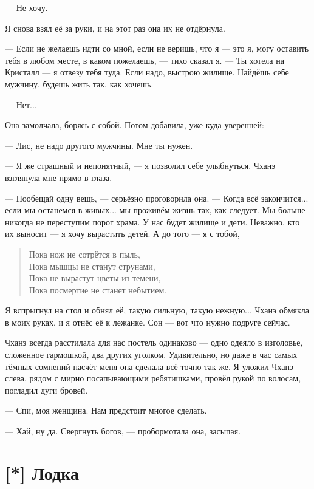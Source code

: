 --- Не хочу.

Я снова взял её за руки, и на этот раз она их не отдёрнула.

--- Если не желаешь идти со мной, если не веришь, что я --- это я, могу оставить тебя в любом месте, в каком пожелаешь, --- тихо сказал я.
--- Ты хотела на Кристалл --- я отвезу тебя туда.
Если надо, выстрою жилище.
Найдёшь себе мужчину, будешь жить так, как хочешь.

--- Нет...

Она замолчала, борясь с собой.
Потом добавила, уже куда уверенней:

--- Лис, не надо другого мужчины.
Мне ты нужен.

--- Я же страшный и непонятный, --- я позволил себе улыбнуться.
Чханэ взглянула мне прямо в глаза.

--- Пообещай одну вещь, --- серьёзно проговорила она.
--- Когда всё закончится... если мы останемся в живых... мы проживём жизнь так, как следует.
Мы больше никогда не переступим порог храма.
У нас будет жилище и дети.
Неважно, кто их выносит --- я хочу вырастить детей.
А до того --- я с тобой,

\begin{verse}
Пока нож не сотрётся в пыль,\\
Пока мышцы не станут струнами,\\
Пока не вырастут цветы из темени,\\
Пока посмертие не станет небытием\FM.
\end{verse}

Я вспрыгнул на стол и обнял её, такую сильную, такую нежную...
Чханэ обмякла в моих руках, и я отнёс её к лежанке.
Сон --- вот что нужно подруге сейчас.

Чханэ всегда расстилала для нас постель одинаково --- одно одеяло в изголовье, сложенное гармошкой, два других уголком.
Удивительно, но даже в час самых тёмных сомнений насчёт меня она сделала всё точно так же.
Я уложил Чханэ слева, рядом с мирно посапывающими ребятишками, провёл рукой по волосам, погладил дуги бровей.

--- Спи, моя женщина.
Нам предстоит многое сделать.

--- Хай, ну да.
Свергнуть богов, --- пробормотала она, засыпая.

\section{[*] Лодка}

